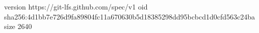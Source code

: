 version https://git-lfs.github.com/spec/v1
oid sha256:4d1bb7e726d9fa89804fc11a670630b5d18385298dd95bcbcd1d0cfd563c24ba
size 2640
